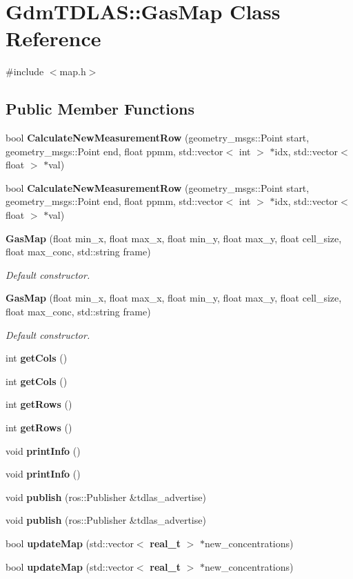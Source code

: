 \section{GdmTDLAS::GasMap Class Reference}
\label{classGdmTDLAS_1_1GasMap}


{\ttfamily \#include $<$map.h$>$}

\subsection*{Public Member Functions}
\begin{DoxyCompactItemize}
\item 
bool {\bf CalculateNewMeasurementRow} (geometry\_\-msgs::Point start, geometry\_\-msgs::Point end, float ppmm, std::vector$<$ int $>$ $\ast$idx, std::vector$<$ float $>$ $\ast$val)
\item 
bool {\bf CalculateNewMeasurementRow} (geometry\_\-msgs::Point start, geometry\_\-msgs::Point end, float ppmm, std::vector$<$ int $>$ $\ast$idx, std::vector$<$ float $>$ $\ast$val)
\item 
{\bf GasMap} (float min\_\-x, float max\_\-x, float min\_\-y, float max\_\-y, float cell\_\-size, float max\_\-conc, std::string frame)
\begin{DoxyCompactList}\small\item\em Default constructor. \end{DoxyCompactList}\item 
{\bf GasMap} (float min\_\-x, float max\_\-x, float min\_\-y, float max\_\-y, float cell\_\-size, float max\_\-conc, std::string frame)
\begin{DoxyCompactList}\small\item\em Default constructor. \end{DoxyCompactList}\item 
int {\bf getCols} ()
\item 
int {\bf getCols} ()
\item 
int {\bf getRows} ()
\item 
int {\bf getRows} ()
\item 
void {\bf printInfo} ()
\item 
void {\bf printInfo} ()
\item 
void {\bf publish} (ros::Publisher \&tdlas\_\-advertise)
\item 
void {\bf publish} (ros::Publisher \&tdlas\_\-advertise)
\item 
bool {\bf updateMap} (std::vector$<$ {\bf real\_\-t} $>$ $\ast$new\_\-concentrations)
\item 
bool {\bf updateMap} (std::vector$<$ {\bf real\_\-t} $>$ $\ast$new\_\-concentrations)
\end{DoxyCompactItemize}

